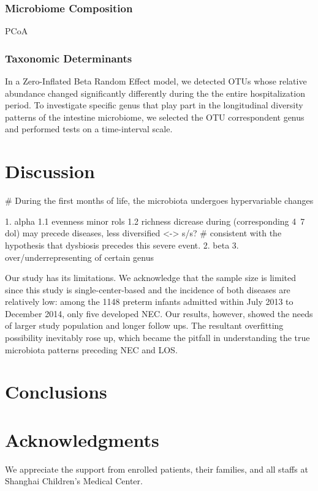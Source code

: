\documentclass[fleqn,10pt,lineno]{wlpeerj} %
\begin{document}
    \subsubsection*{Microbiome Composition}
    PCoA

    \subsubsection*{Taxonomic Determinants}
    In a Zero-Inflated Beta Random Effect model, we detected OTUs whose relative abundance changed significantly differently during the the entire hospitalization period.
    To investigate specific genus that play part in the longitudinal diversity patterns of the intestine microbiome, we selected the OTU correspondent genus and performed tests on a time-interval scale.

\section*{Discussion}
\# During the first months of life, the microbiota undergoes hypervariable changes

1. alpha  1.1 evenness minor rols 1.2 richness dicrease during  (corresponding 4~7 dol) may precede diseases, less diversified <-> s/s? \# consistent with the hypothesis that dysbiosis precedes this severe event.
2. beta
3. over/underrepresenting of certain genus


\noindent
Our study has its limitations. We acknowledge that the sample size is limited since this study is single-center-based and the incidence of both diseases are relatively low: among the 1148 preterm infants admitted within July 2013 to December 2014, only five developed NEC. Our results, however, showed the needs of larger study population and longer follow ups. The resultant overfitting possibility inevitably rose up, which became the pitfall in understanding the true microbiota patterns preceding NEC and LOS.

\section*{Conclusions}

\section*{Acknowledgments}
We appreciate the support from enrolled patients, their families, and all staffs at Shanghai Children’s Medical Center.
\end{document}
